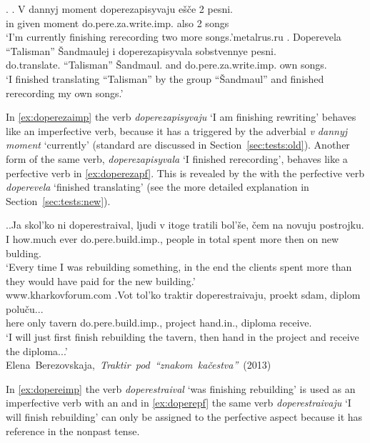 \ex. \ag. \label{ex:doperezaimp}V dannyj moment doperezapisyvaju e\v{s}\v{c}e 2 pesni.\\
in given moment do.pere.za.write.imp. also 2 songs\\
\trans `I'm currently finishing rerecording two more songs.'\hfill metalrus.ru
\bg. \label{ex:doperezapf}Doperevela ``Talisman'' \v{S}andmaulej i doperezapisyvala sobstvennye pesni.\\
do.translate. ``Talisman'' \v{S}andmaul. and do.pere.za.write.imp. own songs.\\
\trans `I finished translating ``Talisman'' by the group ``\v{S}andmaul'' and finished rerecording my own songs.'

In \ref{ex:doperezaimp} the verb \textit{doperezapisyvaju} `I am finishing rewriting' behaves like an imperfective verb, because it has a  triggered by the adverbial \textit{v dannyj moment} `currently' (standard  are discussed in Section~\ref{sec:tests:old}). Another form of the same verb, \textit{doperezapisyvala} `I finished rerecording', behaves like a perfective verb in \ref{ex:doperezapf}. This is revealed by the  with the perfective verb \textit{doperevela} `finished translating' (see the more detailed explanation in Section~\ref{sec:tests:new}).

\ex.\ag.\label{ex:dopereimp}Ja skol'ko ni doperestraival, ljudi v itoge tratili bol'\v{s}e, \v{c}em na novuju postrojku.\\
I how.much ever do.pere.build.imp., people in total spent more then on new bulding.\\
\trans `Every time I was rebuilding something, in the end the clients spent more than they would have paid for the new building.'\\
\hbox{}\hfill\hbox{www.kharkovforum.com}
\bg.\label{ex:doperepf}Vot tol'ko traktir doperestraivaju, proekt sdam, diplom polu\v{c}u...\\
here only tavern do.pere.build.imp., project hand.in., diploma receive.\\
\trans `I will just first finish rebuilding the tavern, then hand in the project and receive the diploma...'\\
\hbox{}\hfill\hbox{Elena Berezovskaja, \textit{Traktir pod ``znakom ka\v{c}estva''} (2013)}

In \ref{ex:dopereimp} the verb \textit{doperestraival} `was finishing rebuilding' is used as an imperfective verb with an  and in \ref{ex:doperepf} the same verb \textit{doperestraivaju} `I will finish rebuilding' can only be assigned to the perfective aspect because it has  reference in the nonpast tense.

